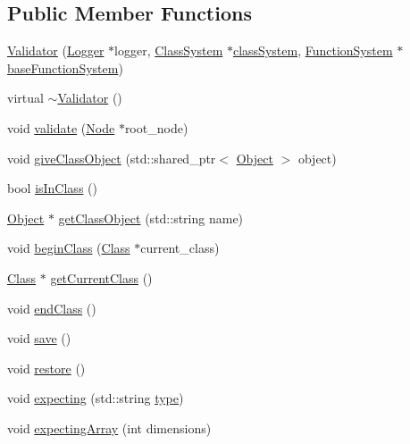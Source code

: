 \subsection*{Public Member Functions}
\begin{DoxyCompactItemize}
\item 
\hyperlink{classValidator_ae4550667c2bc1d85f4654cf6f5efe253}{Validator} (\hyperlink{classLogger}{Logger} $\ast$logger, \hyperlink{classClassSystem}{Class\+System} $\ast$\hyperlink{classSystemHandler_ace6de39b5621a138654577c93f3ce9aa}{class\+System}, \hyperlink{classFunctionSystem}{Function\+System} $\ast$\hyperlink{classSystemHandler_af601707ec9f56e24be4c0541a1c760f4}{base\+Function\+System})
\item 
virtual \hyperlink{classValidator_a4270e7ebf0c451ff80b4ec6fd8eb6a42}{$\sim$\+Validator} ()
\item 
void \hyperlink{classValidator_aa0bc30458ce0255fcec64d8346e384a5}{validate} (\hyperlink{classNode}{Node} $\ast$root\+\_\+node)
\item 
void \hyperlink{classValidator_ad0a3d5e1c57840006e96c74c74eac0aa}{give\+Class\+Object} (std\+::shared\+\_\+ptr$<$ \hyperlink{classObject}{Object} $>$ object)
\item 
bool \hyperlink{classValidator_a497b47a6718ba3b84a73bc9ee4fd9796}{is\+In\+Class} ()
\item 
\hyperlink{classObject}{Object} $\ast$ \hyperlink{classValidator_afe99d9833e5cda3ab1aab764ab99d716}{get\+Class\+Object} (std\+::string name)
\item 
void \hyperlink{classValidator_a364835c9dc181485838d083b6f227fdb}{begin\+Class} (\hyperlink{classClass}{Class} $\ast$current\+\_\+class)
\item 
\hyperlink{classClass}{Class} $\ast$ \hyperlink{classValidator_a342833ad81caff452754620d29083a3d}{get\+Current\+Class} ()
\item 
void \hyperlink{classValidator_a1d31142fe2275fbc9556d1164b01cbfb}{end\+Class} ()
\item 
void \hyperlink{classValidator_a055e6bdb84438449655135b9166bcf2d}{save} ()
\item 
void \hyperlink{classValidator_a0c89c0c840be87b9011cb518d7bc12ff}{restore} ()
\item 
void \hyperlink{classValidator_a3dcf83a58eac283f4beef3a40d79f46f}{expecting} (std\+::string \hyperlink{classSystemHandler_a8ca6090af683e8555051681fd31cd865}{type})
\item 
void \hyperlink{classValidator_ad6035a52a6e449b5a566fec27272751d}{expecting\+Array} (int dimensions)

\end{DoxyCompactItemize}
